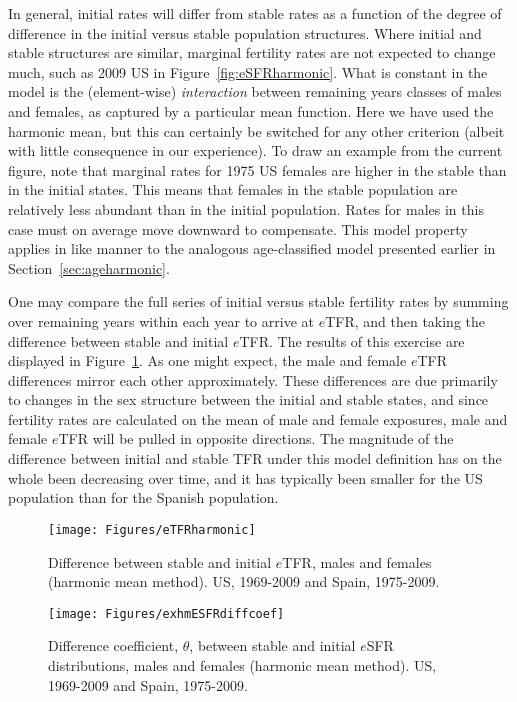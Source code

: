 In general, initial rates will differ from stable rates as a function of the
degree of difference in the initial versus stable population structures. Where
initial and stable structures are similar, marginal fertility rates are not
expected to change much, such as 2009 US in Figure~\ref{fig:eSFRharmonic}. What
is constant in the model is the (element-wise) \textit{interaction} between
remaining years classes of males and females, as captured by a particular mean function.
Here we have used the harmonic mean, but
this can certainly be switched for any other criterion (albeit with little
consequence in our experience). To draw an example from the current figure, note
that marginal rates for 1975 US females are higher in the stable than in the
initial states. This means that females in the stable population are relatively
less abundant than in the initial population. Rates for males in this case must
on average move downward to compensate. This model property applies in like 
manner to the analogous age-classified model
presented earlier in Section~\ref{sec:ageharmonic}.

One may compare the full series of initial versus stable fertility rates by
summing over remaining years within each year to arrive at $e$TFR, and then
taking the difference between stable and initial $e$TFR. The results of this
exercise are displayed in Figure~\ref{fig:eTFRharmonic}. As one might expect,
the male and female $e$TFR differences mirror each other approximately. These
differences are due primarily to changes in the sex structure between the initial and stable
states, and since fertility rates are calculated on the mean of male and female
exposures, male and female $e$TFR will be pulled in opposite directions. The
magnitude of the difference between initial and stable TFR under this model
definition has on the whole been decreasing over time, and it has typically been
smaller for the US population than for the Spanish population.

\begin{figure}[ht!]
        \centering  
          \caption{Difference between stable and initial $e$TFR, males and
          females (harmonic mean method). US, 1969-2009 and Spain,
          1975-2009.}
           \texttt{[image: Figures/eTFRharmonic]}
          \label{fig:eTFRharmonic}
\end{figure}




\begin{figure}[ht!]
        \centering  
          \caption{Difference coefficient, $\theta$, between stable and initial
          $e$SFR distributions, males and females (harmonic mean method). US, 1969-2009
          and Spain, 1975-2009.}
           \texttt{[image: Figures/exhmESFRdiffcoef]}
          \label{fig:exhmESFRdiffcoef}
\end{figure}

\FloatBarrier